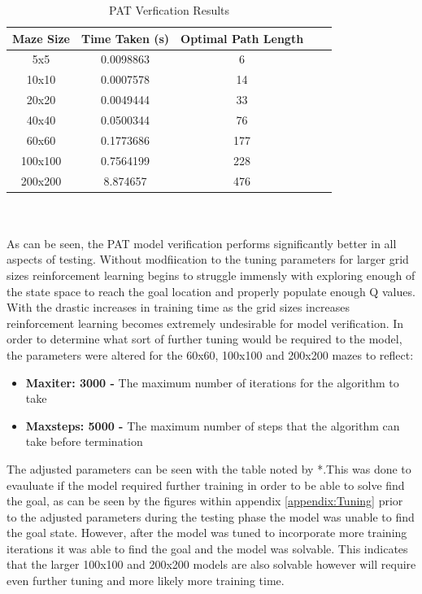 \documentclass[twoside, 12pt, a4paper]{article}
\begin{document}
\begin{table}[ht]
\begin {center}
\begin{tabular}{ | c | c | c | c | c |}
\hline
 \textbf{Maze Size} & \textbf{ Time Taken (s)} &  \textbf{Optimal Path Length}  \\
\hline
5x5 		& 0.0098863	& 6	 \\
10x10 	& 0.0007578	& 14	 \\
20x20 	& 0.0049444 & 33	 \\
40x40		& 0.0500344	& 76	 \\
60x60 	& 0.1773686	& 177	 \\
100x100	& 0.7564199	& 228	 \\
200x200	& 8.874657	& 476	 \\
\hline
\end {tabular}
\caption{\label{tab:table-name}PAT Verfication Results}
\end {center}
\end{table}
\\\\
As can be seen, the PAT model verification performs significantly better in all aspects of testing. Without modfiication to the tuning parameters for larger grid sizes reinforcement learning begins to struggle immensly with exploring enough of the state space to reach the goal location and properly populate enough Q values. With the drastic increases in training time as the grid sizes increases reinforcement learning becomes extremely undesirable for model verification. In order to determine what sort of further tuning would be required to the model, the parameters were altered for the 60x60, 100x100 and 200x200 mazes to reflect:
\begin{itemize}
\item \textbf{Maxiter: 3000 -} The maximum number of iterations for the algorithm to take
\item \textbf{Maxsteps: 5000 -} The maximum number of steps that the algorithm can take before termination
\end{itemize}
The adjusted parameters can be seen with the table noted by *.This was done to evauluate if the model required further training in order to be able to solve find the goal, as can be seen by the figures within appendix \ref{appendix:Tuning} prior to the adjusted parameters during the testing phase the model was unable to find the goal state. However, after the model was tuned to incorporate more training iterations it was able to find the goal and the model was solvable. This indicates that the larger 100x100  and 200x200 models are also solvable however will require even further tuning and more likely more training time. \\
\end{document}
